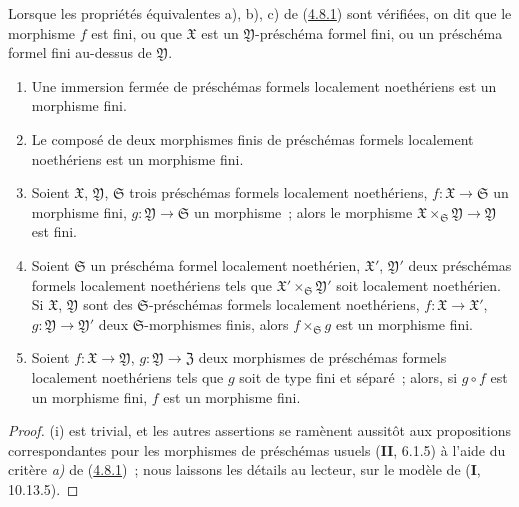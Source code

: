 \begin{definition}[4.8.2]
\label{III.4.8.2-fr}
Lorsque les propriétés équivalentes \textup{a), b), c)} de
\textup{(\hyperref[III.4.8.1-fr]{4.8.1})} sont vérifiées, on dit que le morphisme $f$
est fini, ou que $\mathfrak X$ est un $\mathfrak Y$-préschéma
formel fini, ou un préschéma formel fini au-dessus de $\mathfrak Y$.
\end{definition}

\begin{proposition}[4.8.3]
\label{III.4.8.3-fr}
\begin{enumerate}
\item[\textup{(i)}] Une immersion fermée de préschémas formels localement noethériens
  est un morphisme fini.
\item[\textup{(ii)}] Le composé de deux morphismes finis de préschémas formels
  localement noethériens est un morphisme fini.
\item[\textup{(iii)}] Soient $\mathfrak X$, $\mathfrak Y$, $\mathfrak S$ trois
  préschémas formels localement noethériens, $f:\mathfrak X\to\mathfrak S$ un
  morphisme fini, $g:\mathfrak Y\to\mathfrak S$ un morphisme~; alors le
  morphisme
  $\mathfrak X\times_{\mathfrak S}\mathfrak Y\to\mathfrak Y$ est fini.
\item[\textup{(iv)}] Soient $\mathfrak S$ un préschéma formel localement noethérien,
  $\mathfrak X'$, $\mathfrak Y'$ deux préschémas formels localement
  noethériens tels que $\mathfrak X'\times_{\mathfrak S}\mathfrak Y'$ soit
  localement noethérien. Si $\mathfrak X$, $\mathfrak Y$ sont des
  $\mathfrak S$-préschémas formels localement noethériens,
  $f:\mathfrak X\to\mathfrak X'$, $g:\mathfrak Y\to\mathfrak Y'$ deux
  $\mathfrak S$-morphismes finis, alors $f\times_{\mathfrak S}g$ est un
  morphisme fini.
\item[\textup{(v)}] Soient $f:\mathfrak X\to\mathfrak Y$,
  $g:\mathfrak Y\to\mathfrak Z$ deux morphismes de préschémas formels
  localement noethériens tels que $g$ soit de type fini et séparé~; alors, si
  $g\circ f$ est un morphisme fini, $f$ est un morphisme fini.
\end{enumerate}
\end{proposition}

\begin{proof}
(i) est trivial, et les autres assertions se ramènent aussitôt aux
propositions correspondantes pour les morphismes de préschémas usuels
(\textbf{II}, 6.1.5) à l'aide du critère \emph{a)} de
(\hyperref[III.4.8.1-fr]{4.8.1})~; nous laissons les détails au lecteur, sur le
modèle de (\textbf{I}, 10.13.5).
\end{proof}

